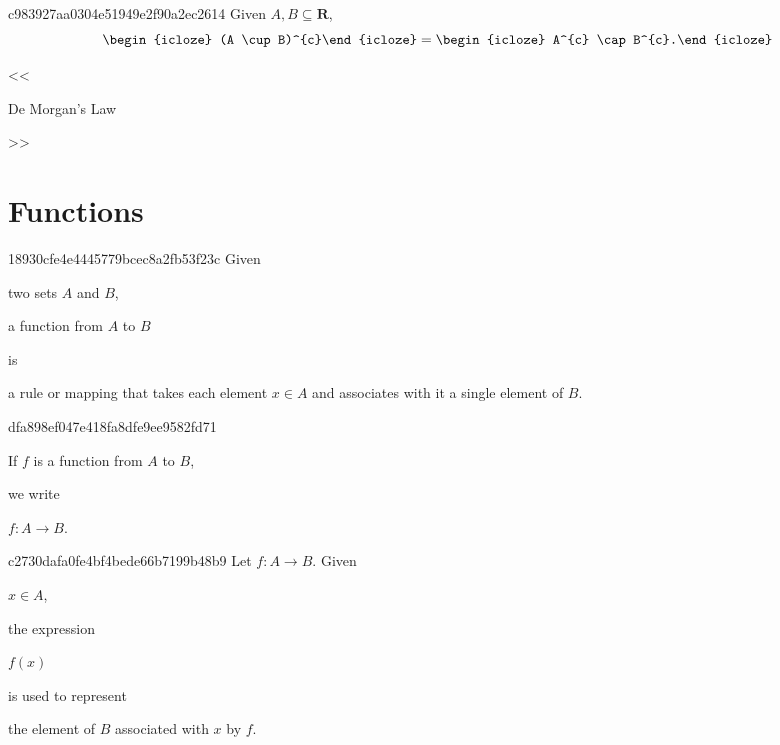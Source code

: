\begin{note}{c983927aa0304e51949e2f90a2ec2614}
    Given \({ A, B \subseteq \mathbf{R} }\),
    \[
        \begin{icloze}{2}(A \cup B)^{c}\end{icloze} = \begin{icloze}{1}A^{c} \cap B^{c}.\end{icloze}
    \]

    \begin{center}
        \tiny
        <<\begin{icloze}{3}De Morgan's Law\end{icloze}>>
    \end{center}
\end{note}

\section{Functions}
\begin{note}{18930cfe4e4445779bcec8a2fb53f23c}
    Given \begin{icloze}{3}two sets \({ A }\) and \({ B }\),\end{icloze} \begin{icloze}{2}a function from \({ A }\) to \({ B }\)\end{icloze} is \begin{icloze}{1}a rule or mapping that takes each element \({ x \in A }\) and associates with it a single element of \({ B }\).\end{icloze}
\end{note}

\begin{note}{dfa898ef047e418fa8dfe9ee9582fd71}
    \begin{icloze}{1}If \({ f }\) is a function from \({ A }\) to \({ B }\),\end{icloze} we write \begin{icloze}{2}\({ f : A \to B }\).\end{icloze}
\end{note}

\begin{note}{c2730dafa0fe4bf4bede66b7199b48b9}
    Let \({ f : A \to B }\).
    Given \begin{icloze}{3}\({ x \in A }\),\end{icloze} the expression \begin{icloze}{2}\({ f(x) }\)\end{icloze} is used to represent \begin{icloze}{1}the element of \({ B }\) associated with \({ x }\) by \({ f }\).\end{icloze}
\end{note}

